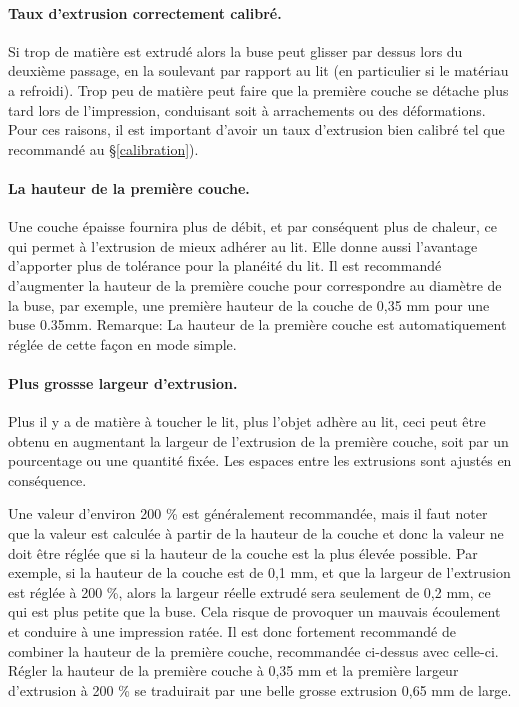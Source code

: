 \paragraph{Taux d'extrusion correctement calibré.} %
\label{par:correct_extrusion_settings}
Si trop de matière est extrudé alors la buse peut glisser par dessus lors du deuxième passage, en la soulevant par rapport au lit (en particulier si le matériau a refroidi). Trop peu de matière peut faire que la première couche se détache plus tard lors de l'impression, conduisant soit à arrachements ou des déformations. Pour ces raisons, il est important d'avoir un taux d'extrusion bien calibré tel que recommandé au §\ref{calibration}).

\paragraph{La hauteur de la première couche.} %
\label{par:first_layer_height}
Une couche épaisse fournira plus de débit, et par conséquent plus de chaleur, ce qui permet à l'extrusion de mieux adhérer au lit. Elle donne aussi l'avantage d'apporter plus de tolérance pour la planéité du lit. Il est recommandé d'augmenter la hauteur de la première couche pour correspondre au diamètre de la buse, par exemple, une première hauteur de la couche de 0,35 mm pour une buse 0.35mm.
Remarque: La hauteur de la première couche est automatiquement réglée de cette façon en mode simple.

\paragraph{Plus grossse largeur d'extrusion.} %
\label{par:wider_extrusion_width}
Plus il y a de matière à toucher le lit, plus l'objet adhère au lit, ceci peut être obtenu en augmentant la largeur de l'extrusion de la première couche, soit par un pourcentage ou une quantité fixée. Les espaces entre les extrusions sont ajustés en conséquence.

Une valeur d'environ 200 \% est généralement recommandée, mais il faut noter que la valeur est calculée à partir de la hauteur de la couche et donc la valeur ne doit être réglée que si la hauteur de la couche est la plus élevée possible. Par exemple, si la hauteur de la couche est de 0,1 mm, et que la largeur de l'extrusion est réglée à 200 \%, alors la largeur réelle extrudé sera seulement de 0,2 mm, ce qui est plus petite que la buse. Cela risque de provoquer un mauvais écoulement et conduire à une impression ratée. Il est donc fortement recommandé de combiner la hauteur de la première couche, recommandée ci-dessus avec celle-ci. Régler la hauteur de la première couche à 0,35 mm et la première largeur d'extrusion à 200 \% se traduirait par une belle grosse extrusion 0,65 mm de large.

